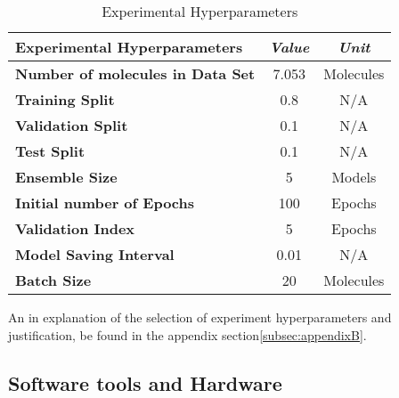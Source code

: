 \begin{table}[H]
    \centering
    \caption{Experimental Hyperparameters}
    \label{tab:experiment}
    \begin{tabular}{|l|c|c|}
        \hline
        \textbf{Experimental Hyperparameters}                          & \multicolumn{1}{l|}{\textit{\textbf{Value}}} & \textit{\textbf{Unit}} \\ \hline
        \multicolumn{1}{|c|}{\textbf{Number of molecules in Data Set}} & 7.053                                        & Molecules              \\ \hline
        \textbf{Training Split}                                        & 0.8                                          & N/A                    \\ \hline
        \textbf{Validation Split}                                      & 0.1                                          & N/A                    \\ \hline
        \textbf{Test Split}                                            & 0.1                                          & N/A                    \\ \hline
        \textbf{Ensemble Size}                                         & 5                                            & Models                 \\ \hline
        \textbf{Initial number of Epochs}                              & 100                                          & Epochs                 \\ \hline
        \textbf{Validation Index}                                      & 5                                            & Epochs                 \\ \hline
        \textbf{Model Saving Interval}                                 & 0.01                                         & N/A                    \\ \hline
        \textbf{Batch Size}                                            & 20                                           & Molecules              \\ \hline
    \end{tabular}
\end{table}

An in explanation of the selection of experiment hyperparameters and justification,
be found in the appendix section\ref{subsec:appendixB}.

\subsection{Software tools and Hardware}\label{subsec:software}


